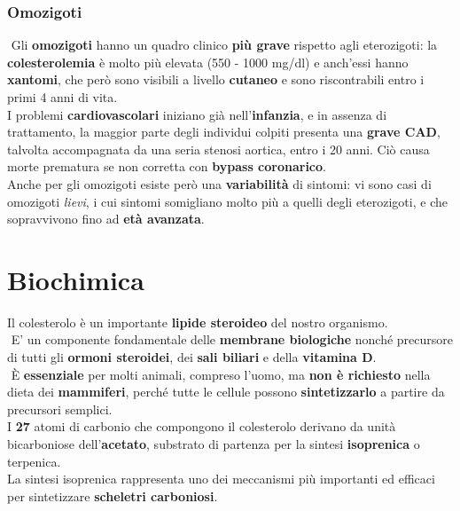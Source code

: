 \documentclass[a4paper, 12pt]{article}
\begin{document}
\begin{titlepage}
\subsubsection{Omozigoti}
 Gli \textbf{omozigoti} hanno un quadro clinico \textbf{più grave} rispetto agli eterozigoti: la \textbf{colesterolemia} è molto più elevata (550 - 1000 mg/dl) e anch’essi hanno \textbf{xantomi}, che però sono visibili a livello \textbf{cutaneo} e sono riscontrabili entro i primi 4 anni di vita.\\
I problemi \textbf{cardiovascolari} iniziano già nell’\textbf{infanzia}, e in assenza di trattamento, la maggior parte degli individui colpiti presenta una \textbf{grave CAD}, talvolta accompagnata da una seria stenosi aortica, entro i 20 anni. Ciò causa morte prematura se non corretta con \textbf{bypass coronarico}.\\
Anche per gli omozigoti esiste però una \textbf{variabilità} di sintomi: vi sono casi di omozigoti \textit{lievi}, i cui sintomi somigliano molto più a quelli degli eterozigoti, e che sopravvivono fino ad \textbf{età avanzata}.

\section{Biochimica}
Il colesterolo è un importante \textbf{lipide steroideo} del nostro organismo.\\
 E’ un componente fondamentale delle \textbf{membrane biologiche} nonché precursore di tutti gli \textbf{ormoni steroidei}, dei \textbf{sali biliari} e della \textbf{vitamina D}.\\
 È \textbf{essenziale} per molti animali, compreso l’uomo, ma \textbf{non è richiesto} nella dieta dei \textbf{mammiferi}, perché tutte le cellule possono \textbf{sintetizzarlo} a partire da precursori semplici.\\
I \textbf{27} atomi di carbonio che compongono il colesterolo derivano da unità bicarboniose dell’\textbf{acetato}, substrato di partenza per la sintesi \textbf{isoprenica} o terpenica.\\
La sintesi isoprenica rappresenta uno dei meccanismi più importanti ed efficaci per sintetizzare \textbf{scheletri carboniosi}.\\


\end{titlepage}
\end{document}
